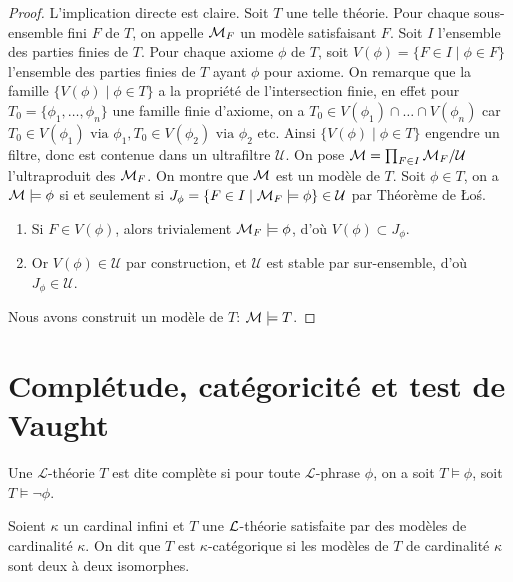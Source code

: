 \begin{proof}
L'implication directe est claire. Soit $T$ une telle théorie. Pour chaque sous-ensemble fini $F$ de $T$, on appelle $\mathcal{M}_F$ un modèle satisfaisant $F$.
Soit $I$ l'ensemble des parties finies de $T$. Pour chaque axiome $\phi$ de $T$, soit $V(\phi) = \{F \in I \mid \phi \in F \}$
l'ensemble des parties finies de $T$ ayant $\phi$ pour axiome. On remarque que la famille $\{V(\phi) \mid \phi \in T\}$ a la propriété 
de l'intersection finie, en effet pour $T_0 = \{\phi_1,\dots,\phi_n\}$ une famille finie d'axiome, on a $T_0 \in V(\phi_1) \cap \dots \cap V(\phi_n)$ 
car $T_0 \in V(\phi_1) \text{ via } \phi_1, T_0 \in V(\phi_2) \text{ via } \phi_2$ etc. Ainsi $\{V(\phi) \mid \phi \in T\}$ engendre un filtre,
donc est contenue dans un ultrafiltre $\mathcal{U}$. On pose $\mathcal{M} = \prod_{F \in I} \mathcal{M}_F / \mathcal{U}$ l'ultraproduit des $\mathcal{M}_F$. On montre que $\mathcal{M}$ est un modèle de $T$.
Soit $\phi \in T$, on a $\mathcal{M} \models \phi$ si et seulement si $J_{\phi} = \{ F \in I \mid \mathcal{M}_F \models \phi \} \in \mathcal{U}$ par Théorème de \L{}oś.
\begin{enumerate}
\item Si $F \in V(\phi)$, alors trivialement $\mathcal{M}_F \models \phi$, d'où $V(\phi) \subset J_{\phi}$.
\item Or $V(\phi) \in \mathcal{U}$ par construction, et $\mathcal{U}$ est stable par sur-ensemble, d'où $J_\phi \in \mathcal{U}$.
\end{enumerate}
Nous avons construit un modèle de $T$: $\mathcal{M} \models T$.
\end{proof}

\section{Complétude, catégoricité et test de Vaught}

\begin{defi}
Une $\mathcal{L}$-théorie $T$ est dite complète si pour toute $\mathcal{L}$-phrase $\phi$, on a soit $T \models \phi$, soit $T \models \neg\phi$.
\end{defi}


\begin{defi}[Categoricité]
Soient $\kappa$ un cardinal infini et $T$ une $\mathcal{L}$-théorie satisfaite par des modèles de cardinalité $\kappa$.
On dit que $T$ est $\kappa$-catégorique si les modèles de $T$ de cardinalité $\kappa$ sont deux à deux isomorphes.
\end{defi}

